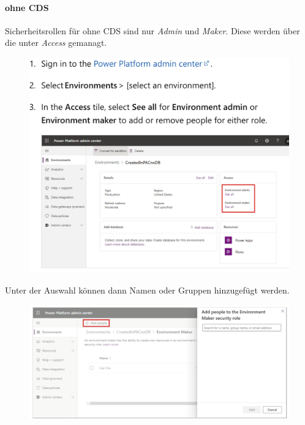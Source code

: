\paragraph*{\Env ohne CDS}
Sicherheitsrollen für \Env ohne \gls{CDS} sind nur \textit{\Env Admin} und \textit{Maker}. Diese werden über die \Env unter \textit{Access} gemanagt.
\begin{figure}[H]
	\centering
	\includegraphics[scale = 0.3]{attachment/chapter_13/Scc011}
\end{figure}
Unter der Auswahl können dann Namen oder Gruppen hinzugefügt werden.
\begin{figure}[H]
	\centering
	\includegraphics[scale = 0.3]{attachment/chapter_13/Scc012}
\end{figure}

